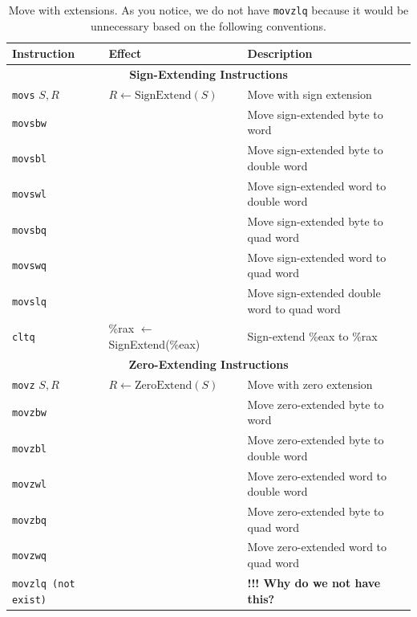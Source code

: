 \documentclass{article}
\begin{document}
\begin{table}[t] %
    \centering
    \small
    \renewcommand{\arraystretch}{1.1}
    \begin{tabular}{l l l}
        \toprule
        \textbf{Instruction} & \textbf{Effect} & \textbf{Description} \\
        \midrule
        \multicolumn{3}{c}{\textbf{Sign-Extending Instructions}} \\
        \midrule
        \texttt{movs} $S, R$  & $R \leftarrow \text{SignExtend}(S)$ & Move with sign extension \\
        \texttt{movsbw} &  & Move sign-extended byte to word \\
        \texttt{movsbl} &  & Move sign-extended byte to double word \\
        \texttt{movswl} &  & Move sign-extended word to double word \\
        \texttt{movsbq} &  & Move sign-extended byte to quad word \\
        \texttt{movswq} &  & Move sign-extended word to quad word \\
        \texttt{movslq} &  & Move sign-extended double word to quad word \\
        \texttt{cltq}   & \%rax $\leftarrow$ SignExtend(\%eax) & Sign-extend \%eax to \%rax \\
        \midrule
        \midrule %
        \multicolumn{3}{c}{\textbf{Zero-Extending Instructions}} \\
        \midrule
        \texttt{movz} $S, R$  & $R \leftarrow \text{ZeroExtend}(S)$ & Move with zero extension \\
        \texttt{movzbw} &  & Move zero-extended byte to word \\
        \texttt{movzbl} &  & Move zero-extended byte to double word \\
        \texttt{movzwl} &  & Move zero-extended word to double word \\
        \texttt{movzbq} &  & Move zero-extended byte to quad word \\
        \texttt{movzwq} &  & Move zero-extended word to quad word \\
        \texttt{movzlq (not exist)} &  & \textbf{!!! Why do we not have this?} \\
        \bottomrule
    \end{tabular}
    \caption{Move with extensions. As you notice, we do not have \texttt{movzlq} because it would be unnecessary based on the following conventions.}
\end{table}
\end{document}
